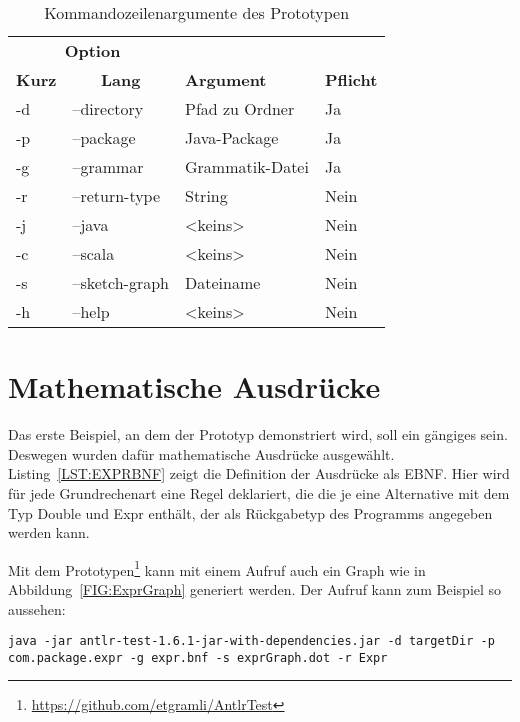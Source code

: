 \documentclass[../InterneDSLs.tex]{subfiles}
\begin{document}
\begin{table}[ht]
\centering
\begin{tabular}{llll}
\multicolumn{2}{c|}{\textbf{Option}} & & \\
\textbf{Kurz} & \multicolumn{1}{c|}{\textbf{Lang}} & \textbf{Argument} & \textbf{Pflicht}\\\hline
-d & --directory    & Pfad zu Ordner  & Ja\\
-p & --package      & Java-Package    & Ja\\
-g & --grammar      & Grammatik-Datei & Ja\\
-r & --return-type  & String          & Nein\\
-j & --java         & <keins>         & Nein\\
-c & --scala        & <keins>         & Nein\\
-s & --sketch-graph & Dateiname       & Nein\\
-h & --help         & <keins>         & Nein\\
\end{tabular}
\caption{Kommandozeilenargumente des Prototypen}
\label{TAB:PrototypeCMD}
\end{table}

\section{Mathematische Ausdrücke}
Das erste Beispiel, an dem der Prototyp demonstriert wird, soll ein gängiges sein. Deswegen wurden dafür mathematische Ausdrücke ausgewählt. Listing~\ref{LST:EXPRBNF} zeigt die Definition der Ausdrücke als EBNF. Hier wird für jede Grundrechenart eine Regel deklariert, die die je eine Alternative mit dem Typ Double und Expr enthält, der als Rückgabetyp des Programms angegeben werden kann.

Mit dem Prototypen\footnote{\url{https://github.com/etgramli/AntlrTest}} kann mit einem Aufruf auch ein Graph wie in Abbildung~\ref{FIG:ExprGraph} generiert werden. Der Aufruf kann zum Beispiel so aussehen:
\begin{lstlisting}
java -jar antlr-test-1.6.1-jar-with-dependencies.jar -d targetDir -p com.package.expr -g expr.bnf -s exprGraph.dot -r Expr
\end{lstlisting}

\begin{figure}

\end{figure}
\end{document}
